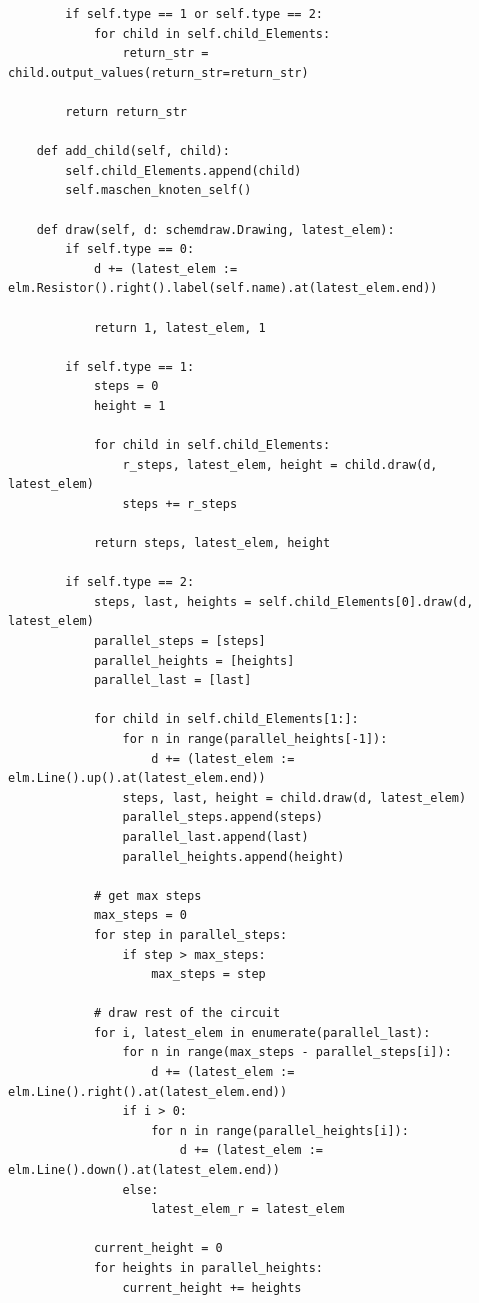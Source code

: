 \documentclass[a4paper,10pt,ngerman]{scrartcl}
\begin{document}
\begin{lstlisting}
        if self.type == 1 or self.type == 2:
            for child in self.child_Elements:
                return_str = child.output_values(return_str=return_str)

        return return_str

    def add_child(self, child):
        self.child_Elements.append(child)
        self.maschen_knoten_self()

    def draw(self, d: schemdraw.Drawing, latest_elem):
        if self.type == 0:
            d += (latest_elem := elm.Resistor().right().label(self.name).at(latest_elem.end))

            return 1, latest_elem, 1

        if self.type == 1:
            steps = 0
            height = 1

            for child in self.child_Elements:
                r_steps, latest_elem, height = child.draw(d, latest_elem)
                steps += r_steps

            return steps, latest_elem, height

        if self.type == 2:
            steps, last, heights = self.child_Elements[0].draw(d, latest_elem)
            parallel_steps = [steps]
            parallel_heights = [heights]
            parallel_last = [last]

            for child in self.child_Elements[1:]:
                for n in range(parallel_heights[-1]):
                    d += (latest_elem := elm.Line().up().at(latest_elem.end))
                steps, last, height = child.draw(d, latest_elem)
                parallel_steps.append(steps)
                parallel_last.append(last)
                parallel_heights.append(height)

            # get max steps
            max_steps = 0
            for step in parallel_steps:
                if step > max_steps:
                    max_steps = step

            # draw rest of the circuit
            for i, latest_elem in enumerate(parallel_last):
                for n in range(max_steps - parallel_steps[i]):
                    d += (latest_elem := elm.Line().right().at(latest_elem.end))
                if i > 0:
                    for n in range(parallel_heights[i]):
                        d += (latest_elem := elm.Line().down().at(latest_elem.end))
                else:
                    latest_elem_r = latest_elem

            current_height = 0
            for heights in parallel_heights:
                current_height += heights


\end{lstlisting}
\end{document}
